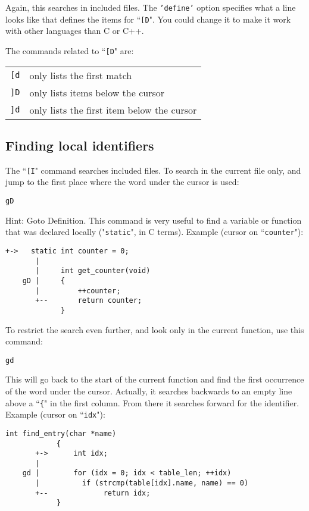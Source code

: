 Again, this searches in included files.
The \texttt{'define'} option specifies what a line looks like that defines the items for ``\texttt{[D}".
You could change it to make it work with other languages than C or C++.

The commands related to ``\texttt{[D}" are:

\begin{center} \begin{tabular}{c l}
\texttt{[d} & only lists the first match \\
\texttt{]D} & only lists items below the cursor \\
\texttt{]d} & only lists the first item below the cursor \\
\end{tabular} \end{center}
\subsection{Finding local identifiers}
The ``\texttt{[I}" command searches included files.
To search in the current file only, and jump to the first place where the word under the cursor is used:

\begin{Verbatim}[samepage=true]
 gD
\end{Verbatim}

Hint: Goto Definition.
This command is very useful to find a variable or function that was declared locally ("\texttt{static}", in C terms).
Example (cursor on ``\texttt{counter}"):

\begin{Verbatim}[samepage=true]
       +->   static int counter = 0;
       |
       |     int get_counter(void)
    gD |     {
       |         ++counter;
       +--       return counter;
             }
\end{Verbatim}

To restrict the search even further, and look only in the current function, use this command:

\begin{Verbatim}[samepage=true]
 gd
\end{Verbatim}

This will go back to the start of the current function and find the first occurrence of the word under the cursor.
Actually, it searches backwards to an empty line above a ``\texttt{\{}" in the first column.
From there it searches forward for the identifier.
Example (cursor on ``\texttt{idx}"):

\begin{Verbatim}[samepage=true]
            int find_entry(char *name)
            {
       +->      int idx;
       |
    gd |        for (idx = 0; idx < table_len; ++idx)
       |          if (strcmp(table[idx].name, name) == 0)
       +--             return idx;
            }
\end{Verbatim}
\clearpage
